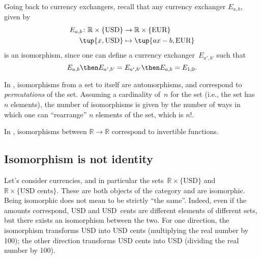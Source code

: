 \begin{example}
Going back to currency exchangers, recall that any currency exchanger $E_{a,b}$, given by
\begin{equation*}
\begin{aligned}
    E_{a,b}\colon \mathbb{R}\times \{\text{USD}\}&\to \mathbb{R}\times \{\text{EUR}\}\\
    \tup{x,\text{USD}}&\mapsto \tup{ax-b,\text{EUR}}
\end{aligned}
\end{equation*}
is an isomorphism, since one can define a currency exchanger~$E_{a',b'}$ such that
\begin{equation*}
    E_{a,b}\then E_{a',b'}=E_{a',b'}\then E_{a,b}=E_{1,0}.
\end{equation*}
\end{example}


\begin{example}
In \FinSet, isomorphisms from a set to itself are automorphisms, and correspond to \emph{permutations} of the set. Assuming a cardinality of~$n$ for the set (i.e., the set has~$n$ elements), the number of isomorphisms is given by the number of ways in which one can ``rearrange'' $n$ elements of the set, which is $n!$.
\end{example}

\begin{example}
In \Set, isomorphisms between $\mathbb{R}\to \mathbb{R}$ correspond to invertible functions. 
\end{example}


\subsection{Isomorphism is not identity}
\begin{example}
Let's consider currencies, and in particular the sets~$\mathbb{R}\times \{\text{USD}\}$ and~$\mathbb{R}\times \{\text{USD cents}\}$. These are both objects of the category \Curr and are isomorphic. Being isomorphic does not mean to be strictly ``the same''. Indeed, even if the amounts correspond, \unit[10]{USD} and \unit[1,000]{USD cents} are different elements of different sets, but there exists an isomorphism between the two. For one direction, the isomorphism transforms USD into USD cents (multiplying the real number by 100); the other direction transforms USD cents into USD (dividing the real number by 100).
\end{example}

